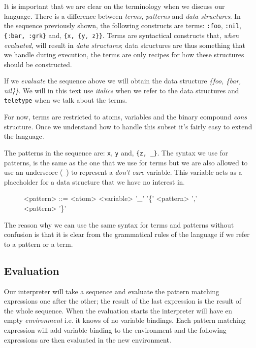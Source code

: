 \documentclass[a4paper,11pt]{article}
\begin{document}
It is important that we are clear on the terminology when we discuss
our language. There is a difference between {\em terms}, {\em
  patterns} and {\em data structures}. In the sequence previously
shown, the following constructs are terms: \verb+:foo+, \verb+:nil+,
\verb+{:bar, :grk}+ and, \verb+{x, {y, z}}+. Terms are syntactical
constructs that, {\em when evaluated}, will result in {\em data
  structures}; data structures are thus something that we handle
during execution, the terms are only recipes for how these structures
should be constructed.

If we {\em evaluate} the sequence above we will obtain the data
structure \textit{ \{foo, \{bar, nil\}\}}. We will in this
text use {\it italics} when we refer to the data structures and
\verb+teletype+ when we talk about the terms.

For now, terms are restricted to atoms, variables and the binary
compound {\em cons} structure. Once we understand how to handle this
subset it's fairly easy to extend the language.

The patterns in the sequence are: \verb+x+, \verb+y+ and,
\verb+{z, _}+. The syntax we use for patterns, is the same as the one
that we use for terms but we are also allowed to use an underscore
(\verb+_+) to represent a {\em don't-care} variable. This variable
acts as a placeholder for a data structure that we have no interest
in.

\begin{figure}[h]
\begin{grammar}
<pattern> ::= <atom>
\alt <variable>
\alt '_'  
\alt '\{' <pattern> ',' <pattern> '\}'
\end{grammar}
\end{figure}

The reason why we can use the same syntax for terms and patterns
without confusion is that it is clear from the grammatical rules of the
language if we refer to a pattern or a term. 

\subsection{Evaluation}
Our interpreter will take a sequence and evaluate the pattern matching
expressions one after the other; the result of the last expression is
the result of the whole sequence. When the evaluation starts the
interpreter will have en empty {\em environment} i.e. it knows of no
variable bindings. Each pattern matching expression will add variable
binding to the environment and the following expressions are then
evaluated in the new environment.
 
\end{document}
